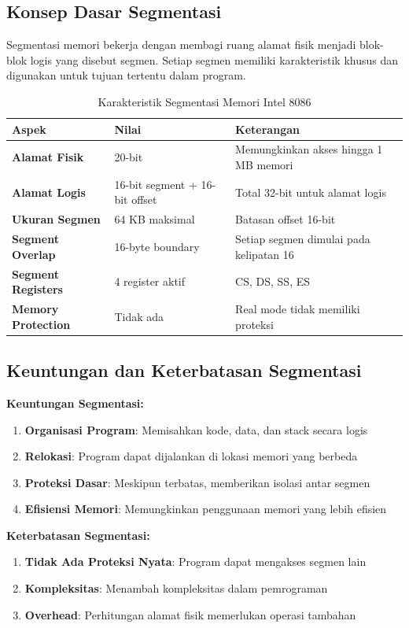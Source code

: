 \subsection{Konsep Dasar Segmentasi}
Segmentasi memori bekerja dengan membagi ruang alamat fisik menjadi blok-blok logis yang disebut segmen. Setiap segmen memiliki karakteristik khusus dan digunakan untuk tujuan tertentu dalam program.

\begin{table}[h]
\centering
\caption{Karakteristik Segmentasi Memori Intel 8086}
\begin{tabular}{|p{3cm}|p{4cm}|p{8cm}|}
\hline
\textbf{Aspek} & \textbf{Nilai} & \textbf{Keterangan} \\
\hline
\textbf{Alamat Fisik} & 20-bit & Memungkinkan akses hingga 1 MB memori \\
\hline
\textbf{Alamat Logis} & 16-bit segment + 16-bit offset & Total 32-bit untuk alamat logis \\
\hline
\textbf{Ukuran Segmen} & 64 KB maksimal & Batasan offset 16-bit \\
\hline
\textbf{Segment Overlap} & 16-byte boundary & Setiap segmen dimulai pada kelipatan 16 \\
\hline
\textbf{Segment Registers} & 4 register aktif & CS, DS, SS, ES \\
\hline
\textbf{Memory Protection} & Tidak ada & Real mode tidak memiliki proteksi \\
\hline
\end{tabular}
\label{tab:memory-segmentation-characteristics}
\end{table}

\subsection{Keuntungan dan Keterbatasan Segmentasi}
\textbf{Keuntungan Segmentasi:}
\begin{enumerate}
    \item \textbf{Organisasi Program}: Memisahkan kode, data, dan stack secara logis
    \item \textbf{Relokasi}: Program dapat dijalankan di lokasi memori yang berbeda
    \item \textbf{Proteksi Dasar}: Meskipun terbatas, memberikan isolasi antar segmen
    \item \textbf{Efisiensi Memori}: Memungkinkan penggunaan memori yang lebih efisien
\end{enumerate}

\textbf{Keterbatasan Segmentasi:}
\begin{enumerate}
    \item \textbf{Tidak Ada Proteksi Nyata}: Program dapat mengakses segmen lain
    \item \textbf{Kompleksitas}: Menambah kompleksitas dalam pemrograman
    \item \textbf{Overhead}: Perhitungan alamat fisik memerlukan operasi tambahan
\end{enumerate}


